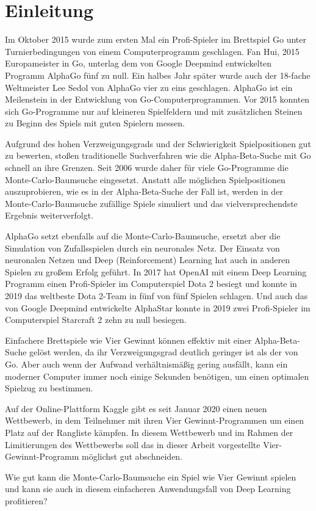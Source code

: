 \section{Einleitung}
\par
Im Oktober 2015 wurde zum ersten Mal ein Profi-Spieler im Brettspiel Go unter Turnierbedingungen von einem Computerprogramm geschlagen. Fan Hui, 2015 Europameister in Go, unterlag dem von Google Deepmind entwickelten Programm AlphaGo fünf zu null. Ein halbes Jahr später wurde auch der 18-fache Weltmeister Lee Sedol von AlphaGo vier zu eins geschlagen. AlphaGo ist ein Meilenstein in der Entwicklung von Go-Computerprogrammen. Vor 2015 konnten sich Go-Programme nur auf kleineren Spielfeldern und mit zusätzlichen Steinen zu Beginn des Spiels mit guten Spielern messen.
\par
Aufgrund des hohen Verzweigungsgrads und der Schwierigkeit Spielpositionen gut zu bewerten, stoßen traditionelle Suchverfahren wie die Alpha-Beta-Suche mit Go schnell an ihre Grenzen. Seit 2006 wurde daher für viele Go-Programme die Monte-Carlo-Baumsuche eingesetzt. Anstatt alle möglichen Spielpositionen auszuprobieren, wie es in der Alpha-Beta-Suche der Fall ist, werden in der Monte-Carlo-Baumsuche zufällige Spiele simuliert und das vielversprechendste Ergebnis weiterverfolgt.
\par
AlphaGo setzt ebenfalls auf die Monte-Carlo-Baumsuche, ersetzt aber die Simulation von Zufallsspielen durch ein neuronales Netz. Der Einsatz von neuronalen Netzen und Deep (Reinforcement) Learning hat auch in anderen Spielen zu großem Erfolg geführt. In 2017 hat OpenAI mit einem Deep Learning Programm einen Profi-Spieler im Computerspiel Dota 2 besiegt und konnte in 2019 das weltbeste Dota 2-Team in fünf von fünf Spielen schlagen. Und auch das von Google Deepmind entwickelte AlphaStar konnte in 2019 zwei Profi-Spieler im Computerspiel Starcraft 2 zehn zu null besiegen.
\par
Einfachere Brettspiele wie Vier Gewinnt können effektiv mit einer Alpha-Beta-Suche gelöst werden, da ihr Verzweigungsgrad deutlich geringer ist als der von Go. Aber auch wenn der Aufwand verhältnismäßig gering ausfällt, kann ein moderner Computer immer noch einige Sekunden benötigen, um einen optimalen Spielzug zu bestimmen.
\par
Auf der Online-Plattform Kaggle gibt es seit Januar 2020 einen neuen Wettbewerb, in dem Teilnehmer mit ihren Vier Gewinnt-Programmen um einen Platz auf der Rangliste kämpfen. In diesem Wettbewerb und im Rahmen der Limitierungen des Wettbewerbs soll das in dieser Arbeit vorgestellte Vier-Gewinnt-Programm möglichst gut abschneiden.\\
\par
Wie gut kann die Monte-Carlo-Baumsuche ein Spiel wie Vier Gewinnt spielen und kann sie auch in diesem einfacheren Anwendungsfall von Deep Learning profitieren? 

